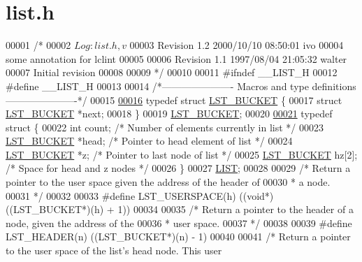 \hypertarget{list_8h_source}{\section{list.\+h}
\label{list_8h_source}
}

\begin{DoxyCode}
00001 \textcolor{comment}{/*}
00002 \textcolor{comment}{  $Log: list.h,v $}
00003 \textcolor{comment}{  Revision 1.2  2000/10/10 08:50:01  ivo}
00004 \textcolor{comment}{  some annotation for lclint}
00005 \textcolor{comment}{}
00006 \textcolor{comment}{  Revision 1.1  1997/08/04 21:05:32  walter}
00007 \textcolor{comment}{  Initial revision}
00008 \textcolor{comment}{}
00009 \textcolor{comment}{*/}
00010 
00011 \textcolor{preprocessor}{#ifndef \_\_LIST\_H}
00012 \textcolor{preprocessor}{#define \_\_LIST\_H}
00013 
00014 \textcolor{comment}{/*---------------------- Macros and type definitions ----------------------*/}
00015 
\hypertarget{list_8h_source_l00016}{}\hyperlink{structLST__BUCKET}{00016} \textcolor{keyword}{typedef} \textcolor{keyword}{struct }\hyperlink{structLST__BUCKET}{LST\_BUCKET} \{
00017   \textcolor{keyword}{struct }\hyperlink{structLST__BUCKET}{LST\_BUCKET} *next;
00018 \}
00019 \hyperlink{structLST__BUCKET}{LST\_BUCKET};
00020 
\hypertarget{list_8h_source_l00021}{}\hyperlink{structLIST}{00021} \textcolor{keyword}{typedef} \textcolor{keyword}{struct }\{
00022   \textcolor{keywordtype}{int} count;      \textcolor{comment}{/* Number of elements currently in list */}
00023   \hyperlink{structLST__BUCKET}{LST\_BUCKET} *head;   \textcolor{comment}{/* Pointer to head element of list      */}
00024   \hyperlink{structLST__BUCKET}{LST\_BUCKET} *z;    \textcolor{comment}{/* Pointer to last node of list         */}
00025   \hyperlink{structLST__BUCKET}{LST\_BUCKET} hz[2];   \textcolor{comment}{/* Space for head and z nodes           */}
00026 \}
00027 \hyperlink{structLIST}{LIST};
00028 
00029 \textcolor{comment}{/* Return a pointer to the user space given the address of the header of}
00030 \textcolor{comment}{ * a node.}
00031 \textcolor{comment}{ */}
00032 
00033 \textcolor{preprocessor}{#define LST\_USERSPACE(h)  ((void*)((LST\_BUCKET*)(h) + 1))}
00034 
00035 \textcolor{comment}{/* Return a pointer to the header of a node, given the address of the}
00036 \textcolor{comment}{ * user space.}
00037 \textcolor{comment}{ */}
00038 
00039 \textcolor{preprocessor}{#define LST\_HEADER(n)   ((LST\_BUCKET*)(n) - 1)}
00040 
00041 \textcolor{comment}{/* Return a pointer to the user space of the list's head node. This user}

\end{DoxyCode}
